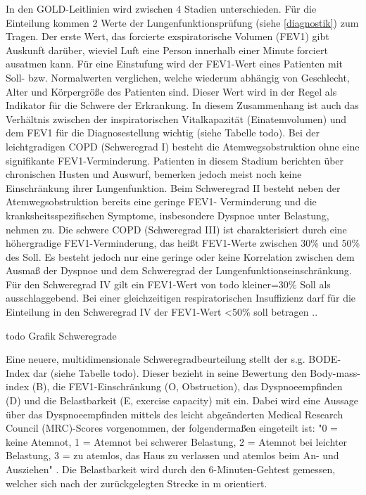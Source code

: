 In den GOLD-Leitlinien wird zwischen 4 Stadien unterschieden. Für die Einteilung kommen 2 Werte der Lungenfunktionsprüfung (siehe \ref{diagnostik}) zum Tragen. Der erste Wert, das forcierte exspiratorische Volumen (FEV1) gibt Auskunft darüber, wieviel Luft eine Person innerhalb einer Minute forciert ausatmen kann. Für eine Einstufung wird der FEV1-Wert eines Patienten mit Soll- bzw. Normalwerten verglichen, welche wiederum abhängig von Geschlecht, Alter und Körpergröße des Patienten sind. Dieser Wert wird in der Regel als Indikator für die Schwere der Erkrankung. In diesem Zusammenhang ist auch das Verhältnis zwischen der inspiratorischen Vitalkapazität (Einatemvolumen) und dem FEV1 für die Diagnosestellung wichtig (siehe Tabelle todo). Bei der leichtgradigen COPD (Schweregrad I) besteht die Atemwegsobstruktion ohne eine signifikante FEV1-Verminderung. Patienten in diesem Stadium berichten über chronischen Husten und Auswurf, bemerken jedoch meist noch keine Einschränkung ihrer Lungenfunktion. Beim Schweregrad II besteht neben der Atemwegsobstruktion bereits eine geringe FEV1- Verminderung und die kranksheitsspezifischen Symptome, insbesondere Dyspnoe unter Belastung, nehmen zu. Die schwere COPD (Schweregrad III) ist charakterisiert durch eine höhergradige FEV1-Verminderung, das heißt FEV1-Werte zwischen 30\% und 50\% des Soll. Es besteht jedoch nur eine geringe oder keine Korrelation zwischen dem Ausmaß der Dyspnoe und dem Schweregrad der Lungenfunktionseinschränkung. Für den Schweregrad IV gilt ein FEV1-Wert von todo kleiner=30\% Soll als ausschlaggebend. Bei einer gleichzeitigen respiratorischen Insuffizienz darf für die Einteilung in den Schweregrad IV der FEV1-Wert <50\% soll betragen \autocite[vgl.][e8]{vogelmeier2007}..

todo Grafik Schweregrade

Eine neuere, multidimensionale Schweregradbeurteilung stellt der s.g. BODE-Index dar (siehe Tabelle todo). Dieser bezieht in seine Bewertung den Body-mass-index (B), die FEV1-Einschränkung (O, Obstruction), das Dyspnoeempfinden (D) und die Belastbarkeit (E, exercise capacity) mit ein. Dabei wird eine Aussage über das Dyspnoeempfinden mittels des leicht abgeänderten Medical Research Council (MRC)-Scores vorgenommen, der folgendermaßen eingeteilt ist: "0 = keine Atemnot, 1 = Atemnot bei schwerer Belastung, 2 = Atemnot bei leichter Belastung, 3 = zu atemlos, das Haus zu verlassen und atemlos beim An- und Ausziehen" \autocite[186f.]{welte2007}. Die Belastbarkeit wird durch den 6-Minuten-Gehtest gemessen, welcher sich nach der zurückgelegten Strecke in m orientiert. 

